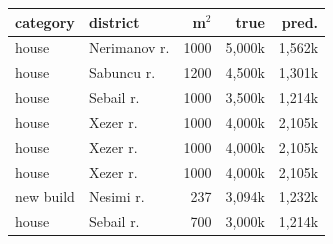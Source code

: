 \begin{tabular}{@{}llrrr@{}}
\toprule
category & district & m$^2$ & true & pred. \\
\midrule
house & Nerimanov r. & 1000 & 5,000k & 1,562k \\
house & Sabuncu r. & 1200 & 4,500k & 1,301k \\
house & Sebail r. & 1000 & 3,500k & 1,214k \\
house & Xezer r. & 1000 & 4,000k & 2,105k \\
house & Xezer r. & 1000 & 4,000k & 2,105k \\
house & Xezer r. & 1000 & 4,000k & 2,105k \\
new build & Nesimi r. & 237 & 3,094k & 1,232k \\
house & Sebail r. & 700 & 3,000k & 1,214k \\
\bottomrule
\end{tabular}

